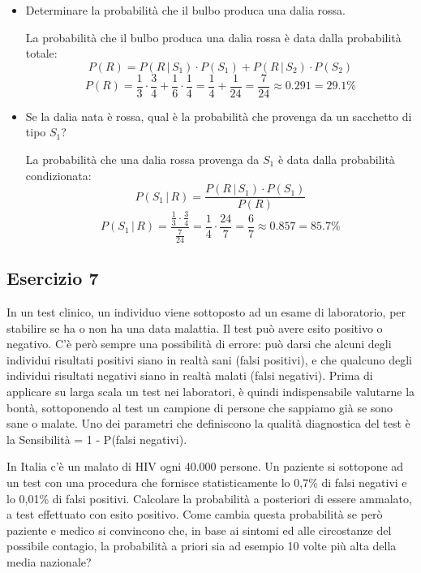 \documentclass[a4paper]{article}
\theoremstyle{break}
\theoremstyle{break}
\theoremstyle{break}
\theoremstyle{break}
\begin{document}
\begin{itemize}
	\item Determinare la probabilità che il bulbo produca una dalia rossa.

	      \vspace{1em}
	      La probabilità che il bulbo produca una dalia rossa è data dalla probabilità totale:
	      \[
		      P(R) = P(R\,|\,S_1) \cdot P(S_1) + P(R\,|\,S_2) \cdot P(S_2)
	      \]
	      \[
		      P(R) = \frac{1}{3} \cdot \frac{3}{4} + \frac{1}{6} \cdot \frac{1}{4} = \frac{1}{4} + \frac{1}{24} = \frac{7}{24} \approx 0.291 = 29.1\%
	      \]
	\item Se la dalia nata è rossa, qual è la probabilità che provenga da un sacchetto di
	      tipo \( S_1 \)?

	      \vspace{1em}
	      La probabilità che una dalia rossa provenga da \( S_1 \) è data dalla probabilità
	      condizionata:
	      \[
		      P(S_1\,|\,R) = \frac{P(R\,|\,S_1) \cdot P(S_1)}{P(R)}
	      \]
	      \[
		      P(S_1\,|\,R) = \frac{\frac{1}{3} \cdot \frac{3}{4}}{\frac{7}{24}} = \frac{1}{4} \cdot \frac{24}{7} = \frac{6}{7} \approx 0.857 = 85.7\%
	      \]
\end{itemize}

\subsection{Esercizio 7}
In un test clinico, un individuo viene sottoposto ad un esame di laboratorio, per
stabilire se ha o non ha una data malattia. Il test può avere esito positivo o negativo.
C’è però sempre una possibilità di errore: può darsi che alcuni degli individui
risultati positivi siano in realtà sani (falsi positivi), e che qualcuno degli individui
risultati negativi siano in realtà malati (falsi negativi). Prima di applicare su larga
scala un test nei laboratori, è quindi indispensabile valutarne la bontà, sottoponendo
al test un campione di persone che sappiamo già se sono sane o malate. Uno dei parametri
che definiscono la qualità diagnostica del test è la Sensibilità = 1 - P(falsi negativi).

\noindent In Italia c’è un malato di HIV ogni 40.000 persone. Un paziente si sottopone
ad un test con una procedura che fornisce statisticamente lo 0,7\% di falsi negativi e lo
0,01\% di falsi positivi. Calcolare la probabilità a posteriori di essere ammalato, a
test effettuato con esito positivo. Come cambia questa probabilità se però paziente e
medico si convincono che, in base ai sintomi ed alle circostanze del possibile contagio,
la probabilità a priori sia ad esempio 10 volte più alta della media nazionale?
\end{document}
